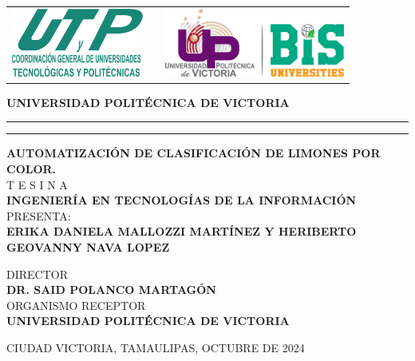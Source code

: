 \documentclass[12pt]{article}
\date{\specialdate\today}
\newcommand{\HRule}{\rule{\linewidth}{0.25mm}}
\newcommand{\ncarrera}            {Ingeniería en Tecnologías de la Información}
\newcommand{\nasesorinstitucional}{Dr. Said Polanco Martagón}
\newcommand{\NombreAlumno}{Erika Daniela Mallozzi Martínez y Heriberto Geovanny Nava Lopez}
\newcommand{\NombreProyecto}{Automatización de Clasificación de Limones por Color.}
\newcommand{\organismoreceptor}   {Universidad Politécnica de Victoria}
\newcommand{\fechaPortada}               {Octubre de 2024}
\newcommand{\separacionCorta}{0.0cm}
\newcommand{\separacionLarga}{0.5cm}
\newcommand{\iemph}[1]{\MakeTextUppercase{#1}}
\begin{document}
\setcounter{page}{1}
\thispagestyle{empty}

\begin{center}

\begin{tabular}{cp{5cm}c}
\includegraphics[height=2.25cm]{UTYP.png} & 
& \includegraphics[height=2.25cm]{LogoUPV_2023.png}   \\
\end{tabular}

\Large \textbf{UNIVERSIDAD POLITÉCNICA DE VICTORIA}
\vspace{0.5cm}
\hrule
\vspace{0.1cm} 
\hrule
\vspace{0.5cm}


\textbf{\iemph{\NombreProyecto}} \\[\separacionLarga]
T E S I N A \\

\textbf{\iemph{\ncarrera}} \\[\separacionLarga]

PRESENTA: \\[\separacionCorta]
\textbf{\iemph{\NombreAlumno}}\\[\separacionLarga]

\vspace{3cm}

DIRECTOR \\[\separacionCorta]
\textbf{\iemph{\nasesorinstitucional}} \\[\separacionCorta]



ORGANISMO RECEPTOR \\[\separacionCorta]
\textbf{\iemph{\organismoreceptor}} \\[\separacionLarga]

\end{center}
\begin{flushright}
\iemph{Ciudad Victoria, Tamaulipas, \fechaPortada}
\end{flushright}
\end{document}
